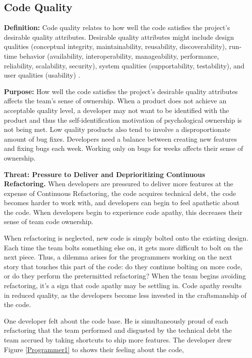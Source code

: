 \subsection{Code Quality}
\textbf{Definition:} Code quality relates to how well the code satisfies the project's desirable quality attributes. Desirable quality attributes might include design qualities (conceptual integrity, maintainability, reusability, discoverability), run-time behavior (availability, interoperability, manageability, performance, reliability, scalability, security), system qualities (supportability, testability), and user qualities (usability) \cite{Meier2009}. 

\textbf{Purpose:} How well the code satisfies the project's desirable quality attributes affects the team's sense of ownership. When a product does not achieve an acceptable quality level, a developer may not want to be identified with the product and thus the self-identification motivation of psychological ownership is not being met. Low quality products also tend to involve a disproportionate amount of bug fixes. Developers need a balance between creating new features and fixing bugs each week. Working only on bugs for weeks affects their sense of ownership.    

\textbf{Threat: Pressure to Deliver and Deprioritizing Continuous Refactoring.} When developers are pressured to deliver more features at the expense of Continuous Refactoring, the code acquires technical debt, the code becomes harder to work with, and developers can begin to feel apathetic about the code. When developers begin to experience code apathy, this decreases their sense of team code ownership. 

When refactoring is neglected, new code is simply bolted onto the existing design. Each time the team bolts something else on, it gets more difficult to bolt on the next piece. Thus, a dilemma arises for the programmers working on the next story that touches this part of the code: do they continue bolting on more code, or do they perform the pretermitted refactoring? When the team begins avoiding refactoring, it's a sign that code apathy may be settling in. Code apathy results in reduced quality, as the developers become less invested in the craftsmanship of the code.

One developer felt  about the code base. He is simultaneously proud of each refactoring that the team performed and disgusted by the technical debt the team accrued by taking shortcuts to ship more features. The developer drew Figure \ref{Programmer1} to shows their feeling about the code, 

